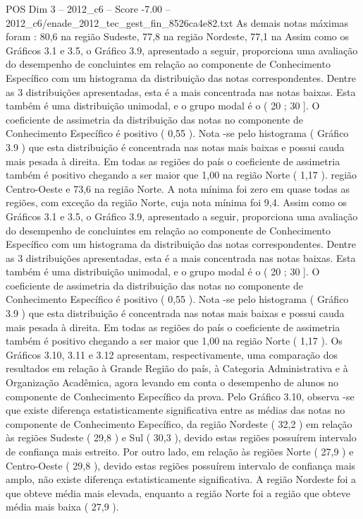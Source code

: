 \begin{textsample}{POS Dim 3 – 2012\_c6 – Score -7.00 – 2012\_c6/enade\_2012\_tec\_gest\_fin\_8526ca4e82.txt}
As demais notas máximas foram : 80,6 na região Sudeste, 77,8 na região Nordeste, 77,1 na Assim como os Gráficos 3.1 e 3.5, o Gráfico 3.9, apresentado a seguir, proporciona uma avaliação do desempenho de concluintes em relação ao componente de Conhecimento Específico com um histograma da distribuição das notas correspondentes.
Dentre as 3 distribuições apresentadas, esta é a mais concentrada nas notas baixas.
Esta também é uma distribuição unimodal, e o grupo modal é o ( 20 ; 30 ].
O coeficiente de assimetria da distribuição das notas no componente de Conhecimento Específico é positivo ( 0,55 ).
Nota -se pelo histograma ( Gráfico 3.9 ) que esta distribuição é concentrada nas notas mais baixas e possui cauda mais pesada à direita.
Em todas as regiões do país o coeficiente de assimetria também é positivo chegando a ser maior que 1,00 na região Norte ( 1,17 ). região Centro-Oeste e 73,6 na região Norte.
A nota mínima foi zero em quase todas as regiões, com exceção da região Norte, cuja nota mínima foi 9,4.
Assim como os Gráficos 3.1 e 3.5, o Gráfico 3.9, apresentado a seguir, proporciona uma avaliação do desempenho de concluintes em relação ao componente de Conhecimento Específico com um histograma da distribuição das notas correspondentes.
Dentre as 3 distribuições apresentadas, esta é a mais concentrada nas notas baixas.
Esta também é uma distribuição unimodal, e o grupo modal é o ( 20 ; 30 ].
O coeficiente de assimetria da distribuição das notas no componente de Conhecimento Específico é positivo ( 0,55 ).
Nota -se pelo histograma ( Gráfico 3.9 ) que esta distribuição é concentrada nas notas mais baixas e possui cauda mais pesada à direita.
Em todas as regiões do país o coeficiente de assimetria também é positivo chegando a ser maior que 1,00 na região Norte ( 1,17 ).
Os Gráficos 3.10, 3.11 e 3.12 apresentam, respectivamente, uma comparação dos resultados em relação à Grande Região do país, à Categoria Administrativa e à Organização Acadêmica, agora levando em conta o desempenho de alunos no componente de Conhecimento Específico da prova.
Pelo Gráfico 3.10, observa -se que existe diferença estatisticamente significativa entre as médias das notas no componente de Conhecimento Específico, da região Nordeste ( 32,2 ) em relação às regiões Sudeste ( 29,8 ) e Sul ( 30,3 ), devido estas regiões possuírem intervalo de confiança mais estreito.
Por outro lado, em relação às regiões Norte ( 27,9 ) e Centro-Oeste ( 29,8 ), devido estas regiões possuírem intervalo de confiança mais amplo, não existe diferença estatisticamente significativa.
A região Nordeste foi a que obteve média mais elevada, enquanto a região Norte foi a região que obteve média mais baixa ( 27,9 ).

\end{textsample}
